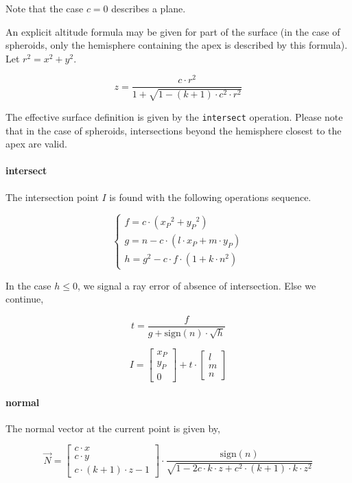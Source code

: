 Note that the case $c=0$ describes a plane.

An explicit altitude formula may be given for part of the surface (in the case
of spheroids, only the hemisphere containing the apex is described by this
formula). Let $r^2 = x^2 + y^2$.

\begin{equation} \label{eq:standard-z}
z = \frac{c \cdot r^2}{1 + \sqrt{1 - (k + 1) \cdot c^2 \cdot r^2}}
\end{equation}

The effective surface definition is given by the \lstinline{intersect}
operation.  Please note that in the case of spheroids, intersections
beyond the hemisphere closest to the apex are valid.

\paragraph{intersect}
The intersection point $I$ is found with the following operations sequence.

\begin{equation} \begin{cases}
f = c \cdot ({x_P}^2 + {y_P}^2) \\
g = n - c \cdot (l \cdot x_P + m \cdot y_P) \\
h = g^2 - c \cdot f \cdot (1 + k \cdot n^2)
\end{cases} \end{equation}

In the case $h \leq 0$, we signal a ray error of absence of intersection.
Else we continue,

\begin{equation}
t = \frac{f}{g + \textrm{sign}(n) \cdot \sqrt{h}}
\end{equation}

\begin{equation}
I = \begin{bmatrix} x_P \\ y_P \\ 0 \end{bmatrix} + t \cdot
    \begin{bmatrix} l \\ m \\ n \end{bmatrix}
\end{equation}

\paragraph{normal}
The normal vector at the current point is given by,

\begin{equation}
\overrightarrow{N} =
\begin{bmatrix}
c \cdot x \\ c \cdot y \\ c \cdot (k+1) \cdot z - 1
\end{bmatrix} \cdot
\frac{\textrm{sign}(n)}{
\sqrt{1 - 2 c \cdot k \cdot z + c^2 \cdot (k+1) \cdot k \cdot z^2}}
\end{equation}

